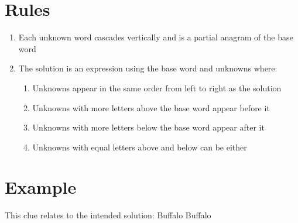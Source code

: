 \documentclass[letterpaper]{article}
\begin{document}
\fontsize{12pt}{12pt}\selectfont
\section*{Rules}

\begin{enumerate}
    \item Each unknown word cascades vertically and is a partial anagram of the base word
    \item The solution is an expression using the base word and unknowns where:
    \begin{enumerate}
        \item Unknowns appear in the same order from left to right as the solution
        \item Unknowns with more letters above the base word appear before it
        \item Unknowns with more letters below the base word appear after it
        \item Unknowns with equal letters above and below can be either
    \end{enumerate}
\end{enumerate}

\vspace*{1em}
\section*{Example}

This clue relates to the intended solution: Buffalo Buffalo
\end{document}
